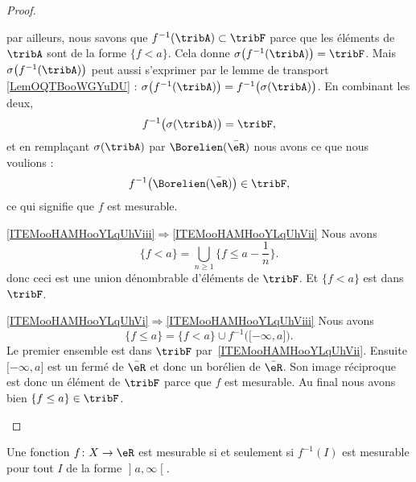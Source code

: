 \begin{proof}
\begin{subproof}
            par ailleurs, nous savons que \( f^{-1}(\tribA)\subset\tribF\) parce que les éléments de \( \tribA\) sont de la forme \( \{ f<a \}\). Cela donne \( \sigma\big( f^{-1}(\tribA) \big)=\tribF\). Mais \( \sigma\big( f^{-1}(\tribA) \big)\) peut aussi s'exprimer par le lemme de transport \ref{LemOQTBooWGYuDU} : \( \sigma\big( f^{-1}(\tribA) \big)=f^{-1}\big( \sigma(\tribA) \big)\). En combinant les deux,
            \begin{equation}
                f^{-1}\big( \sigma(\tribA) \big)=\tribF,
            \end{equation}
            et en remplaçant \( \sigma(\tribA)\) par \( \Borelien(\bar \eR)\) nous avons ce que nous voulions :
            \begin{equation}
                f^{-1}\big( \Borelien(\bar\eR) \big)\in\tribF,
            \end{equation}
            ce qui signifie que \( f\) est mesurable.
        \item[\ref{ITEMooHAMHooYLqUhViii}\( \Rightarrow\)\ref{ITEMooHAMHooYLqUhVii}]
            Nous avons
            \begin{equation}
                \{ f<a \}=\bigcup_{n\geq 1}\{ f\leq a-\frac{1}{ n } \}.
            \end{equation}
            donc ceci est une union dénombrable d'éléments de \( \tribF\). Et \( \{ f<a \}\) est dans \( \tribF\).
        \item[\ref{ITEMooHAMHooYLqUhVi}\( \Rightarrow\)\ref{ITEMooHAMHooYLqUhViii}]
            Nous avons
            \begin{equation}
                \{ f\leq a \}=\{ f<a \}\cup f^{-1}\big( \mathopen[ -\infty , a \mathclose] \big).
            \end{equation}
            Le premier ensemble est dans \( \tribF\) par~\ref{ITEMooHAMHooYLqUhVii}. Ensuite \( \mathopen[ -\infty , a \mathclose]\) est un fermé de \( \bar \eR\) et donc un borélien de \( \bar \eR\). Son image réciproque est donc un élément de \( \tribF\) parce que \( f\) est mesurable. Au final nous avons bien \( \{ f\leq a \}\in\tribF\).
    \end{subproof}
\end{proof}

\begin{lemma}   \label{LemFOlheqw}
    Une fonction \( f\colon X\to \eR\) est mesurable si et seulement si \( f^{-1}(I)\) est mesurable pour tout \( I\) de la forme \( \mathopen] a , \infty \mathclose[\).
\end{lemma}

